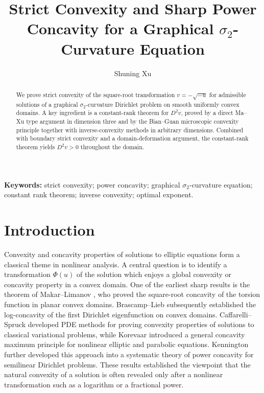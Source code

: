 \documentclass{article}
\date{}
\title{Strict Convexity and Sharp Power Concavity for a Graphical
$\sigma_2$-Curvature Equation}
\author{Shuning Xu}
\numberwithin{equation}{section}
\begin{document}
\maketitle
\begin{abstract}
We prove strict convexity of the square-root transformation
\(v=-\sqrt{-u}\) for admissible solutions of a graphical
\(\sigma_2\)-curvature Dirichlet problem on smooth uniformly convex
domains. A key ingredient is a constant-rank theorem for \(D^2v\),
proved by a direct Ma--Xu type argument in dimension three and by
the Bian--Guan microscopic convexity principle together with
inverse-convexity methods in arbitrary dimensions. Combined with
boundary strict convexity and a domain-deformation argument, the
constant-rank theorem yields \(D^2v>0\) throughout the domain.
\end{abstract}

\noindent\textbf{Keywords:}
strict convexity; power concavity; graphical \(\sigma_2\)-curvature equation;
constant rank theorem; inverse convexity; optimal exponent.

\section{Introduction}
Convexity and concavity properties of solutions to elliptic equations
form a classical theme in nonlinear analysis. A central question is to
identify a transformation $\Phi(u)$ of the solution which enjoys a
global convexity or concavity property in a convex domain. One of the
earliest sharp results is the theorem of Makar--Limanov \cite{ML71},
who proved the square-root concavity of the torsion function in planar
convex domains. Brascamp--Lieb \cite{BrascampLieb1976} subsequently
established the log-concavity of the first Dirichlet eigenfunction on
convex domains. Caffarelli--Spruck \cite{CS82} developed PDE methods
for proving convexity properties of solutions to classical variational
problems, while Korevaar \cite{Korevaar1983} introduced a general
concavity maximum principle for nonlinear elliptic and parabolic
equations. Kennington \cite{Ken85} further developed this approach into
a systematic theory of power concavity for semilinear Dirichlet
problems. These results established the viewpoint that the natural
convexity of a solution is often revealed only after a nonlinear
transformation such as a logarithm or a fractional power.
\end{document}
